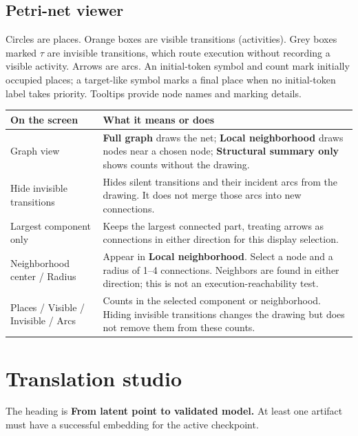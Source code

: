 \documentclass[11pt,a4paper]{article}
\makeatletter
\newcommand{\ui}[1]{\textbf{#1}}
\newenvironment{controls}{%
  \small\begin{longtable}{@{}>{\raggedright\arraybackslash}p{.34\linewidth}
    >{\raggedright\arraybackslash}p{.62\linewidth}@{}}
  \toprule\textbf{On the screen} & \textbf{What it means or does}\\\midrule\endhead
  \bottomrule\endfoot
}{\end{longtable}\normalsize}
\makeatother
\begin{document}
\subsection{Petri-net viewer}
Circles are places. Orange boxes are visible transitions (activities). Grey
boxes marked $\tau$ are invisible transitions, which route execution without
recording a visible activity. Arrows are arcs. An initial-token symbol and
count mark initially occupied places; a target-like symbol marks a final place
when no initial-token label takes priority. Tooltips provide node names and
marking details.

\begin{controls}
Graph view & \ui{Full graph} draws the net; \ui{Local neighborhood} draws
nodes near a chosen node; \ui{Structural summary only} shows counts without
the drawing.\\
Hide invisible transitions & Hides silent transitions and their incident arcs
from the drawing. It does not merge those arcs into new connections.\\
Largest component only & Keeps the largest connected part, treating arrows
as connections in either direction for this display selection.\\
Neighborhood center / Radius & Appear in \ui{Local neighborhood}. Select a
node and a radius of 1--4 connections. Neighbors are found in either direction;
this is not an execution-reachability test.\\
Places / Visible / Invisible / Arcs & Counts in the selected component or
neighborhood. Hiding invisible transitions changes the drawing but does not
remove them from these counts.\\
\end{controls}

\section{Translation studio}
\label{sec:translation}
The heading is \ui{From latent point to validated model.} At least one
artifact must have a successful embedding for the active checkpoint.
\end{document}

